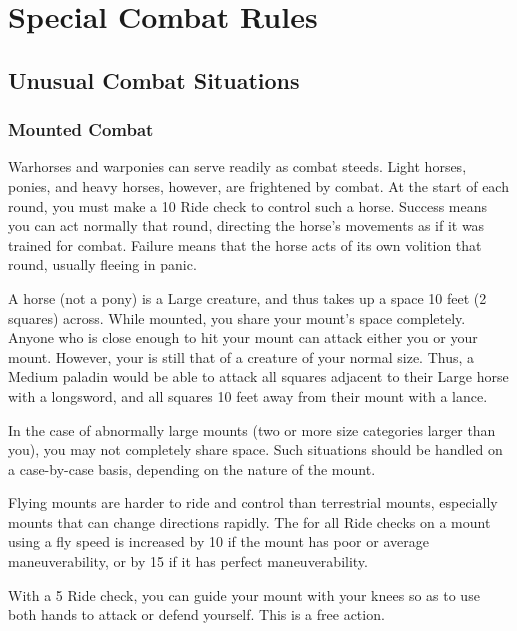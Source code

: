 \section{Special Combat Rules}

    \subsection{Unusual Combat Situations}

        \subsubsection{Mounted Combat}\label{Mounted Combat}
             Warhorses and warponies can serve readily as combat steeds. Light horses, ponies, and heavy horses, however, are frightened by combat.
            At the start of each round, you must make a  10 Ride check to control such a horse.
            Success means you can act normally that round, directing the horse's movements as if it was trained for combat.
            Failure means that the horse acts of its own volition that round, usually fleeing in panic.

             A horse (not a pony) is a Large creature, and thus takes up a space 10 feet (2 squares) across. While mounted, you share your mount's space completely. Anyone who is close enough to hit your mount can attack either you or your mount. However, your  is still that of a creature of your normal size. Thus, a Medium paladin would be able to attack all squares adjacent to their Large horse with a longsword, and all squares 10 feet away from their mount with a lance.

            In the case of abnormally large mounts (two or more size categories larger than you), you may not completely share space. Such situations should be handled on a case-by-case basis, depending on the nature of the mount.

             Flying mounts are harder to ride and control than terrestrial mounts, especially mounts that can change directions rapidly.
            The  for all Ride checks on a mount using a fly speed is increased by 10 if the mount has poor or average maneuverability, or by 15 if it has perfect maneuverability.

             With a  5 Ride check, you can guide your mount with your knees so as to use both hands to attack or defend yourself. This is a free action.

